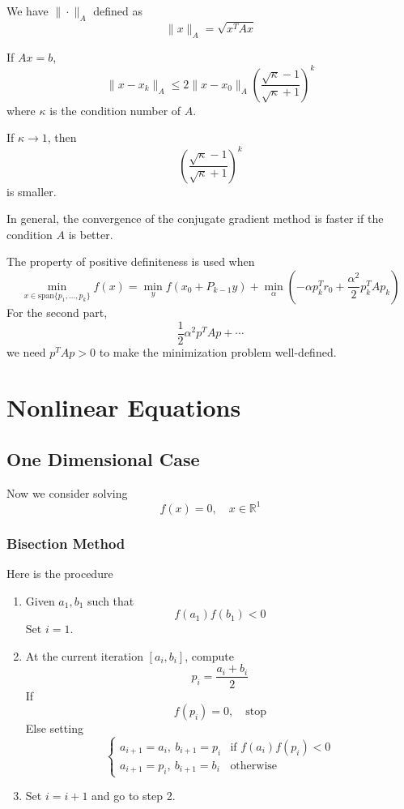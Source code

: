 \begin{definition}[$A$-norm]
    We have $\|\cdot\|_A$ defined as \[
        \|x\|_A = \sqrt{x^T A x}
    \]
\end{definition}

\begin{theorem}
    If $Ax = b$, \[
        \|x - x_k\|_A \leq 2 \|x - x_0\|_A \left( \frac{\sqrt{\kappa} - 1}{\sqrt{\kappa} + 1} \right)^k
    \]
    where $\kappa$ is the condition number of $A$.
\end{theorem}

If $\kappa \to 1$, then \[
    \left( \frac{\sqrt{\kappa} - 1}{\sqrt{\kappa} + 1} \right)^k
\] 
is smaller.

In general, the convergence of the conjugate gradient method is faster if the condition $A$ is better.

\begin{remark}
    The property of positive definiteness is used when \[
        \min_{x \in \text{span}\{p_1, \ldots, p_k\}} f(x) = \min_{y} f(x_0 + P_{k-1} y) + \min_{\alpha} (- \alpha p_k^T r_0 + \frac{\alpha^2}{2} p_k^T A p_k)
    \]
    For the second part, \[
        \frac{1}{2} \alpha^2 p^T A p + \cdots
    \]
    we need $p^T A p > 0$ to make the minimization problem well-defined.
\end{remark}

\chapter{Nonlinear Equations}

\section{One Dimensional Case}

Now we consider solving \[
    f(x) = 0, \quad x \in \mathbb{R}^1
\]

\subsection{Bisection Method}

Here is the procedure
\begin{enumerate}[label=$\arabic*^\circ$]
    \item Given $a_1, b_1$ such that \[
        f(a_1)f(b_1) < 0
    \]  
    Set $i = 1$.
    \item At the current iteration $[a_i, b_i]$, compute \[
        p_i = \frac{a_i + b_i}{2}
    \]
    If \[
        f(p_i) = 0, \quad \mbox{stop}
    \]  
    Else setting \[
        \begin{cases}
            a_{i+1} = a_i,\ b_{i+1} = p_i & \mbox{if } f(a_i)f(p_i) < 0 \\
            a_{i+1} = p_i,\ b_{i+1} = b_i & \mbox{otherwise}
        \end{cases}
    \]
    \item Set $i = i + 1$ and go to step 2.
\end{enumerate}

